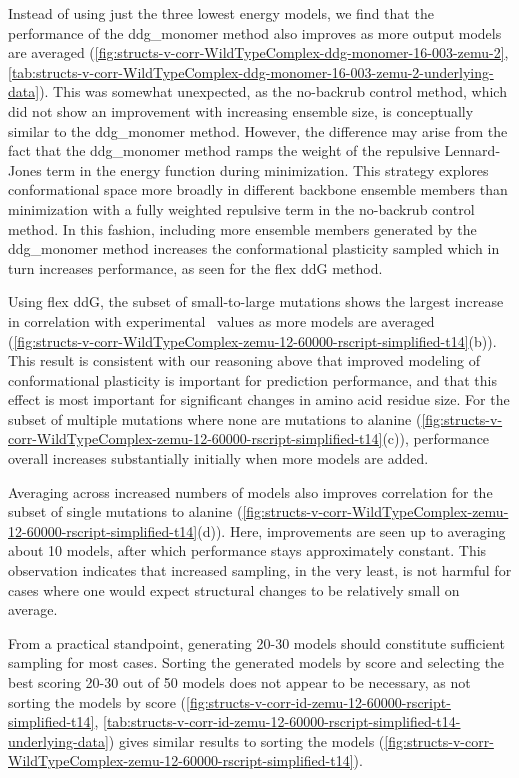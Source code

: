 Instead of using just the three lowest energy models\cite{kellogg_role_2011}, we find that the performance of the ddg\_monomer method also improves as more output models are averaged (\cref{fig:structs-v-corr-WildTypeComplex-ddg-monomer-16-003-zemu-2}, \cref{tab:structs-v-corr-WildTypeComplex-ddg-monomer-16-003-zemu-2-underlying-data}).
This was somewhat unexpected, as the no-backrub control method, which did not show an improvement with increasing ensemble size, is conceptually similar to the ddg\_monomer method. However, the difference may arise from the fact that the ddg\_monomer method ramps the weight of the repulsive Lennard-Jones term in the energy function during minimization. This strategy explores conformational space more broadly in different backbone ensemble members than minimization with a fully weighted repulsive term in the no-backrub control method. In this fashion, including more ensemble members generated by the ddg\_monomer method increases the conformational plasticity sampled which in turn increases performance, as seen for the flex ddG method.

Using flex ddG, the subset of small-to-large mutations shows the largest increase in correlation with experimental \ddg\ values as more models are averaged (\cref{fig:structs-v-corr-WildTypeComplex-zemu-12-60000-rscript-simplified-t14}(b)). This result is consistent with our reasoning above that improved modeling of conformational plasticity is important for prediction performance, and that this effect is most important for significant changes in amino acid residue size. For the subset of multiple mutations where none are mutations to alanine (\cref{fig:structs-v-corr-WildTypeComplex-zemu-12-60000-rscript-simplified-t14}(c)), performance overall increases substantially initially when more models are added.

Averaging across increased numbers of models also improves correlation for the subset of single mutations to alanine (\cref{fig:structs-v-corr-WildTypeComplex-zemu-12-60000-rscript-simplified-t14}(d)).
Here, improvements are seen up to averaging about 10 models, after which performance stays approximately constant.
This observation indicates that increased sampling, in the very least, is not harmful for cases where one would expect structural changes to be relatively small on average.

From a practical standpoint, generating 20-30 models should constitute sufficient sampling for most cases. Sorting the generated models by score and selecting the best scoring 20-30 out of 50 models does not appear to be necessary, as not sorting the models by score (\cref{fig:structs-v-corr-id-zemu-12-60000-rscript-simplified-t14}, \cref{tab:structs-v-corr-id-zemu-12-60000-rscript-simplified-t14-underlying-data}) gives similar results to sorting the models (\cref{fig:structs-v-corr-WildTypeComplex-zemu-12-60000-rscript-simplified-t14}).

